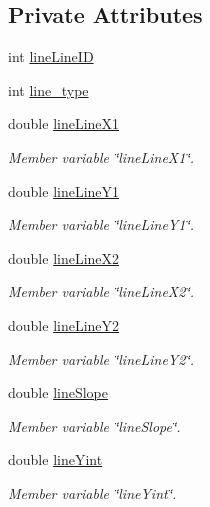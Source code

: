 \subsection*{Private Attributes}
\begin{DoxyCompactItemize}
\item 
int \mbox{\hyperlink{classLine_a92cbc39dd66e02a0507132422a2a830c}{line\+Line\+ID}}
\item 
int \mbox{\hyperlink{classLine_aa5bac2c364a75b5212500dce6846ee0b}{line\+\_\+type}}
\item 
double \mbox{\hyperlink{classLine_ac581c18e7d6a976b14dd986d42cb8163}{line\+Line\+X1}}
\begin{DoxyCompactList}\small\item\em Member variable \char`\"{}line\+Line\+X1\char`\"{}. \end{DoxyCompactList}\item 
double \mbox{\hyperlink{classLine_a46e251350694d1bdf8425d9f9a24f896}{line\+Line\+Y1}}
\begin{DoxyCompactList}\small\item\em Member variable \char`\"{}line\+Line\+Y1\char`\"{}. \end{DoxyCompactList}\item 
double \mbox{\hyperlink{classLine_a795ef48c075a36f0dea1af10b5ff323d}{line\+Line\+X2}}
\begin{DoxyCompactList}\small\item\em Member variable \char`\"{}line\+Line\+X2\char`\"{}. \end{DoxyCompactList}\item 
double \mbox{\hyperlink{classLine_aa0f76375751fb3a75b9593161ecfc0e2}{line\+Line\+Y2}}
\begin{DoxyCompactList}\small\item\em Member variable \char`\"{}line\+Line\+Y2\char`\"{}. \end{DoxyCompactList}\item 
double \mbox{\hyperlink{classLine_afdf693a798435ec16076396f3631853e}{line\+Slope}}
\begin{DoxyCompactList}\small\item\em Member variable \char`\"{}line\+Slope\char`\"{}. \end{DoxyCompactList}\item 
double \mbox{\hyperlink{classLine_a35197c3051202d4c4f0bb7d122780368}{line\+Yint}}
\begin{DoxyCompactList}\small\item\em Member variable \char`\"{}line\+Yint\char`\"{}. \end{DoxyCompactList}\item 

\end{DoxyCompactItemize}
